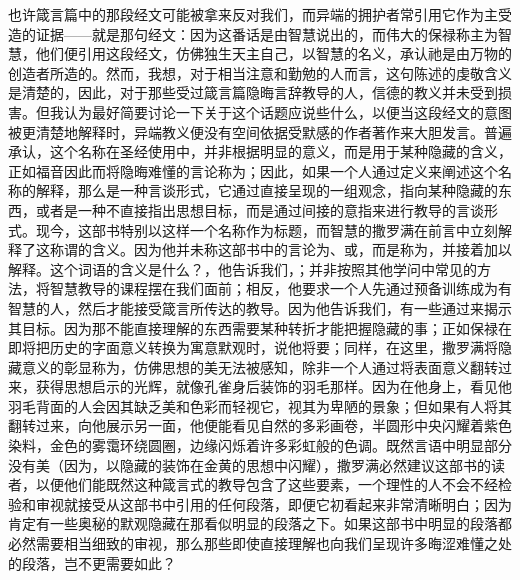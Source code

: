 也许箴言篇中的那段经文可能被拿来反对我们，而异端的拥护者常引用它作为主受造的证据——就是那句经文：因为这番话是由智慧说出的，而伟大的保禄称主为智慧，他们便引用这段经文，仿佛独生天主自己，以智慧的名义，承认祂是由万物的创造者所造的。然而，我想，对于相当注意和勤勉的人而言，这句陈述的虔敬含义是清楚的，因此，对于那些受过箴言篇隐晦言辞教导的人，信德的教义并未受到损害。但我认为最好简要讨论一下关于这个话题应说些什么，以便当这段经文的意图被更清楚地解释时，异端教义便没有空间依据受默感的作者著作来大胆发言。普遍承认，这个名称在圣经使用中，并非根据明显的意义，而是用于某种隐藏的含义，正如福音因此而将隐晦难懂的言论称为；因此，如果一个人通过定义来阐述这个名称的解释，那么是一种言谈形式，它通过直接呈现的一组观念，指向某种隐藏的东西，或者是一种不直接指出思想目标，而是通过间接的意指来进行教导的言谈形式。现今，这部书特别以这样一个名称作为标题，而智慧的撒罗满在前言中立刻解释了这称谓的含义。因为他并未称这部书中的言论为、或，而是称为，并接着加以解释。这个词语的含义是什么？，他告诉我们，；并非按照其他学问中常见的方法，将智慧教导的课程摆在我们面前；相反，他要求一个人先通过预备训练成为有智慧的人，然后才能接受箴言所传达的教导。因为他告诉我们，有一些通过来揭示其目标。因为那不能直接理解的东西需要某种转折才能把握隐藏的事；正如保禄在即将把历史的字面意义转换为寓意默观时，说他将要；同样，在这里，撒罗满将隐藏意义的彰显称为，仿佛思想的美无法被感知，除非一个人通过将表面意义翻转过来，获得思想启示的光辉，就像孔雀身后装饰的羽毛那样。因为在他身上，看见他羽毛背面的人会因其缺乏美和色彩而轻视它，视其为卑陋的景象；但如果有人将其翻转过来，向他展示另一面，他便能看见自然的多彩画卷，半圆形中央闪耀着紫色染料，金色的雾霭环绕圆圈，边缘闪烁着许多彩虹般的色调。既然言语中明显部分没有美（因为，以隐藏的装饰在金黄的思想中闪耀），撒罗满必然建议这部书的读者，以便他们能既然这种箴言式的教导包含了这些要素，一个理性的人不会不经检验和审视就接受从这部书中引用的任何段落，即便它初看起来非常清晰明白；因为肯定有一些奥秘的默观隐藏在那看似明显的段落之下。如果这部书中明显的段落都必然需要相当细致的审视，那么那些即使直接理解也向我们呈现许多晦涩难懂之处的段落，岂不更需要如此？\par

